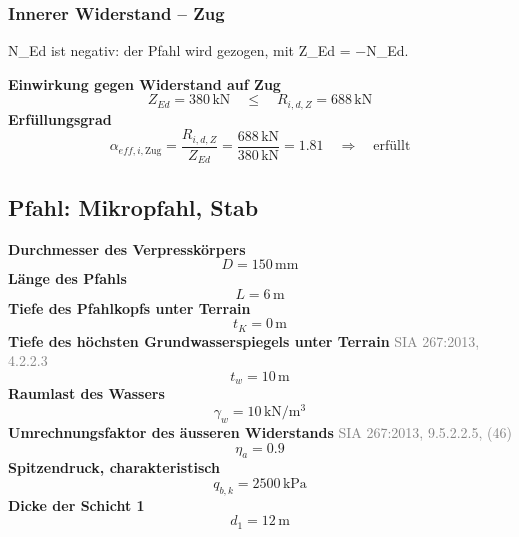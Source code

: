 \documentclass[11pt,a4paper]{article}
\newcommand{\normref}[1]{{\small\textcolor{gray}{#1}}}
\begin{document}
\subsubsection{Innerer Widerstand – Zug}
N\_Ed ist negativ: der Pfahl wird gezogen, mit Z\_Ed = −N\_Ed.

\noindent\textbf{Einwirkung gegen Widerstand auf Zug}
\begin{equation*}
Z_{Ed} = 380\,\mathrm{kN} \quad \le \quad R_{i,d,Z} = 688\,\mathrm{kN}
\end{equation*}
\noindent\textbf{Erfüllungsgrad}
\begin{equation*}
\alpha_{eff,i,\text{Zug}} = \frac{R_{i,d,Z}}{Z_{Ed}} = \frac{688\,\mathrm{kN}}{380\,\mathrm{kN}} = 1.81 \quad \Rightarrow \quad \text{erfüllt}
\end{equation*}
\subsection{Pfahl: Mikropfahl, Stab}
\noindent\textbf{Durchmesser des Verpresskörpers}
\begin{equation*}
D = 150\,\mathrm{mm}
\end{equation*}
\noindent\textbf{Länge des Pfahls}
\begin{equation*}
L = 6\,\mathrm{m}
\end{equation*}
\noindent\textbf{Tiefe des Pfahlkopfs unter Terrain}
\begin{equation*}
t_K = 0\,\mathrm{m}
\end{equation*}
\noindent\textbf{Tiefe des höchsten Grundwasserspiegels unter Terrain} \hfill \normref{SIA 267:2013, 4.2.2.3}
\begin{equation*}
t_w = 10\,\mathrm{m}
\end{equation*}
\noindent\textbf{Raumlast des Wassers}
\begin{equation*}
\gamma_w = 10\,\mathrm{kN}/\mathrm{m}^{3}
\end{equation*}
\noindent\textbf{Umrechnungsfaktor des äusseren Widerstands} \hfill \normref{SIA 267:2013, 9.5.2.2.5, (46)}
\begin{equation*}
\eta_a = 0.9
\end{equation*}
\noindent\textbf{Spitzendruck, charakteristisch}
\begin{equation*}
q_{b,k} = 2500\,\mathrm{kPa}
\end{equation*}
\noindent\textbf{Dicke der Schicht 1}
\begin{equation*}
d_{1} = 12\,\mathrm{m}
\end{equation*}
\end{document}
